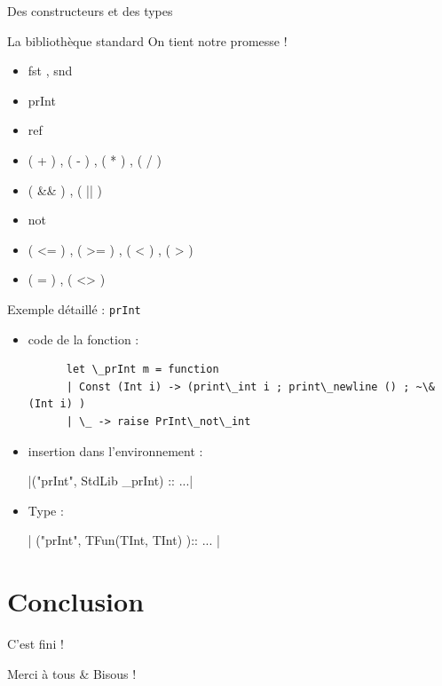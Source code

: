 \documentclass{beamer}
\begin{document}
\begin{frame}{Des constructeurs et des types}
  
\end{frame}



\begin{frame}{La bibliothèque standard}
  On tient notre promesse !

  \begin{itemize}
  \item fst , snd
  \item prInt
  \item ref
  \item ( + ) , ( - ) , ( * ) , ( / )
  \item ( \&\& ) ,  ( || )
  \item not
  \item ( <= ) , ( >= ) , ( < ) , ( > )
  \item ( = ) , ( <> )
  \end{itemize}
\end{frame}

\begin{frame}{Exemple détaillé : \texttt{prInt}}
  \begin{itemize}
  \item code de la fonction :

    \begin{verbatim}
      let \_prInt m = function
      | Const (Int i) -> (print\_int i ; print\_newline () ; ~\& (Int i) )
      | \_ -> raise PrInt\_not\_int
    \end{verbatim}

  \item insertion dans l'environnement :

    |("prInt", StdLib _prInt) :: ...|

  \item Type :

    | ("prInt", TFun(TInt, TInt) ):: ... |


  \end{itemize}
  \end{frame}

\section{Conclusion}
\begin{frame}{C'est fini !}
  \begin{center}
    \Huge Merci à tous \& Bisous !
  \end{center}
\end{frame}
\end{document}
